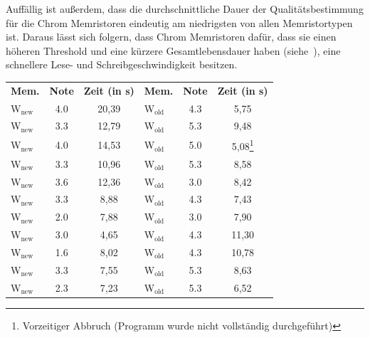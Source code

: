 Auffällig ist außerdem, dass die durchschnittliche Dauer der Qualitätsbestimmung für die Chrom Memristoren eindeutig am niedrigsten von allen Memristortypen ist. Daraus lässt sich folgern, dass Chrom Memristoren dafür, dass sie einen höheren Threshold und eine kürzere Gesamtlebensdauer haben (siehe~\cite{knowm_comp_2019}), eine schnellere Lese- und Schreibgeschwindigkeit besitzen.

\begin{table}
  \centering
    \begin{tabular}{l|c|c||l|c|c}
      \textbf{Mem.} & \textbf{Note} & \textbf{Zeit (in s)} & \textbf{Mem.} & \textbf{Note} & \textbf{Zeit (in s)} \\
      W$_{\text{new}}$            & 4.0           & 20,39                & W$_{\text{old}}$            & 4.3           & 5,75     \\
      W$_{\text{new}}$            & 3.3           & 12,79                & W$_{\text{old}}$            & 5.3           & 9,48     \\
      W$_{\text{new}}$            & 4.0           & 14,53                & W$_{\text{old}}$            & 5.0           & 5,08\footnote{\label{tab_footnote}Vorzeitiger Abbruch (Programm wurde nicht vollständig durchgeführt)}     \\
      W$_{\text{new}}$            & 3.3           & 10,96                & W$_{\text{old}}$            & 5.3           & 8,58     \\
      W$_{\text{new}}$            & 3.6           & 12,36                & W$_{\text{old}}$            & 3.0           & 8,42     \\
      W$_{\text{new}}$            & 3.3           & 8,88                 & W$_{\text{old}}$            & 4.3           & 7,43     \\
      W$_{\text{new}}$            & 2.0           & 7,88                 & W$_{\text{old}}$            & 3.0           & 7,90     \\
      W$_{\text{new}}$            & 3.0           & 4,65                 & W$_{\text{old}}$            & 4.3           & 11,30    \\
      W$_{\text{new}}$            & 1.6           & 8,02                 & W$_{\text{old}}$            & 4.3           & 10,78    \\
      W$_{\text{new}}$            & 3.3           & 7,55                 & W$_{\text{old}}$            & 5.3           & 8,63     \\
      W$_{\text{new}}$            & 2.3           & 7,23                 & W$_{\text{old}}$            & 5.3           & 6,52     \\

\end{tabular}
\end{table}
